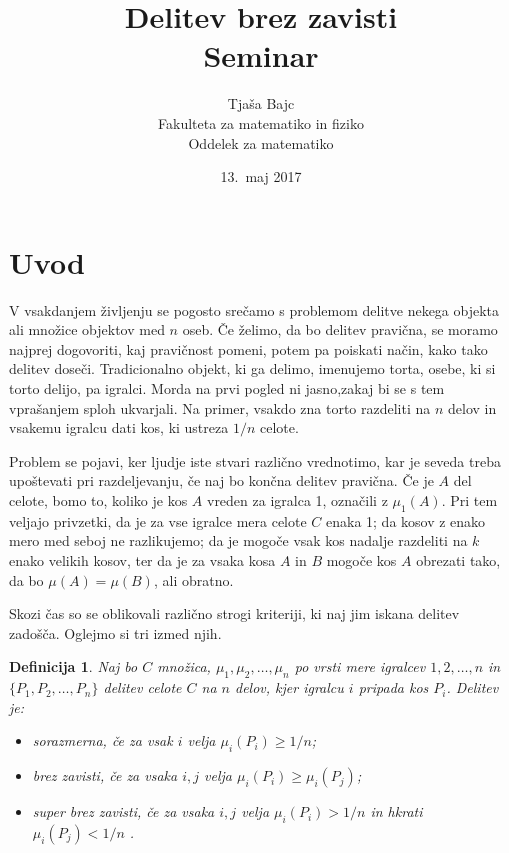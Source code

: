 \documentclass[a4paper,12pt]{article}
\title{Delitev brez zavisti \\ 
\Large Seminar}
\author{Tjaša Bajc \\
Fakulteta za matematiko in fiziko \\
Oddelek za matematiko}
\date{13.\ maj 2017}
\newtheorem{definicija}{Definicija}
\begin{document}


\maketitle



\section{Uvod}

V vsakdanjem življenju se pogosto srečamo s problemom delitve nekega objekta ali množice objektov med $n$ oseb. Če želimo, da bo delitev pravična, se moramo najprej dogovoriti, kaj pravičnost pomeni, potem pa poiskati način, kako tako delitev doseči. Tradicionalno objekt, ki ga delimo, imenujemo torta, osebe, ki si torto delijo, pa igralci. %
Morda na prvi pogled ni jasno,zakaj bi se s tem vprašanjem sploh ukvarjali. Na primer, vsakdo zna torto razdeliti na $n$ delov in vsakemu igralcu dati kos, ki ustreza $1/n$ celote. 

Problem se pojavi, ker ljudje iste stvari različno vrednotimo, kar je seveda treba upoštevati pri razdeljevanju, če naj bo končna delitev pravična. Če je $A$ del celote, bomo to, koliko je kos $A$ vreden za igralca 1, označili z $\mu_1(A)$. Pri tem veljajo privzetki, da je za vse igralce mera celote $C$ enaka 1; %
da kosov z enako mero med seboj ne razlikujemo; da je mogoče vsak kos nadalje razdeliti na $k$ enako velikih kosov, ter da je za vsaka kosa $A$ in $B$ mogoče kos $A$ obrezati tako, da bo $\mu(A) = \mu(B)$, ali obratno.


Skozi čas so se oblikovali različno strogi kriteriji, ki naj jim iskana delitev zadošča. Oglejmo si tri izmed njih.

\begin{definicija}
Naj bo $C$ množica, $\mu_1, \mu_2, \ldots, \mu_n$ po vrsti mere igralcev $1, 2, \ldots, n$ in $\{P_1, P_2, \ldots, P_n\}$ delitev celote $C$ na $n$ delov, kjer igralcu $i$ pripada kos $P_i$. Delitev je:

\begin{itemize}[noitemsep]
\item {\em sorazmerna\/}, če za vsak $i$ velja $\mu_i(P_i) \geq 1/n$;
\item {\em brez zavisti\/}, če za vsaka $i, j$ velja $\mu_i(P_i) \geq \mu_i(P_j)$;
\item{\em super brez zavisti\/}, če za vsaka $i, j$ velja $\mu_i(P_i) > 1/n$ in hkrati $\mu_i(P_j) < 1/n$ .								
\end{itemize}

\end{definicija}
\end{document}
